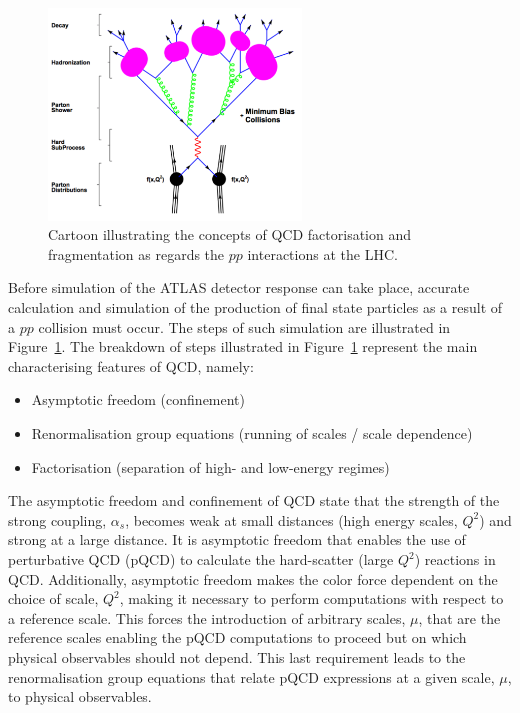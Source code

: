 \begin{figure}[!htb]
    \begin{center}
        \includegraphics[width=0.6\textwidth]{figures/event_simulation/pp_simulation_steps}
        \caption{
            Cartoon illustrating the concepts of QCD factorisation and fragmentation as regards
            the $pp$ interactions at the LHC.
            {\color{red}{redo this figure}}
        }
        \label{fig:pp_sim_steps}
    \end{center}
\end{figure}

Before simulation of the ATLAS detector response can take place, accurate calculation and simulation of the production of final
state particles as a result of a $pp$ collision must occur.
The steps of such simulation are illustrated in Figure~\ref{fig:pp_sim_steps}.
The breakdown of steps illustrated in Figure~\ref{fig:pp_sim_steps} represent the main characterising features
of QCD, namely: 
\begin{itemize}
    \item Asymptotic freedom (confinement)
    \item Renormalisation group equations (running of scales / scale dependence)
    \item Factorisation (separation of high- and low-energy regimes)
\end{itemize}

The asymptotic freedom and confinement of QCD state that the strength of the strong coupling, $\alpha_s$, becomes weak at
small distances (high energy scales, $Q^2$) and strong at a large distance.
It is asymptotic freedom that enables the use of perturbative QCD (pQCD) to calculate the hard-scatter (large $Q^2$)
reactions in QCD. Additionally, asymptotic freedom makes the color force dependent on the choice of scale, $Q^2$,
making it necessary to perform computations with respect to a reference scale.
This forces the introduction of arbitrary scales, $\mu$, that are the reference scales enabling the pQCD computations
to proceed but on which physical observables should not depend.
This last requirement leads to the renormalisation group equations that relate pQCD expressions at a given
scale, $\mu$, to physical observables.

